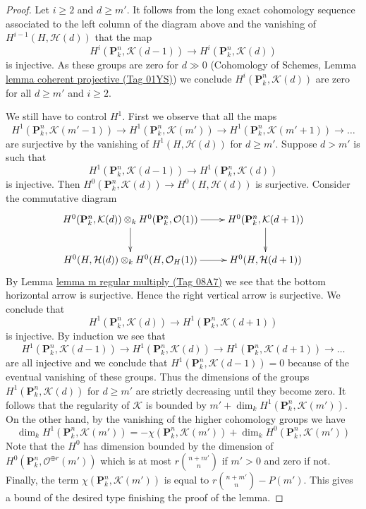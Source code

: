 \documentclass{amsart}
\theoremstyle{plain}
\theoremstyle{definition}
\theoremstyle{remark}
\numberwithin{equation}{subsection}
\begin{document}
\begin{proof}
\medskip\noindent
Let $i \geq 2$ and $d \geq m'$. It follows from the long exact
cohomology sequence associated to the left column of the diagram
above and the vanishing of $H^{i - 1}(H, \mathcal{H}(d))$
that the map
$$
H^i(\mathbf{P}^n_k, \mathcal{K}(d - 1))
\longrightarrow
H^i(\mathbf{P}^n_k, \mathcal{K}(d))
$$
is injective. As these groups are zero for $d \gg 0$
(Cohomology of Schemes,
Lemma \href{https://stacks.math.columbia.edu/tag/01YS}{lemma coherent projective (Tag 01YS)})
we conclude $H^i(\mathbf{P}^n_k, \mathcal{K}(d))$ are zero
for all $d \geq m'$ and $i \geq 2$.

\medskip\noindent
We still have to control $H^1$. First we observe that all the maps
$$
H^1(\mathbf{P}^n_k, \mathcal{K}(m' - 1)) \to
H^1(\mathbf{P}^n_k, \mathcal{K}(m')) \to
H^1(\mathbf{P}^n_k, \mathcal{K}(m' + 1)) \to \ldots
$$
are surjective by the vanishing of $H^1(H, \mathcal{H}(d))$ for $d \geq m'$.
Suppose $d > m'$ is such that
$$
H^1(\mathbf{P}^n_k, \mathcal{K}(d - 1))
\longrightarrow
H^1(\mathbf{P}^n_k, \mathcal{K}(d))
$$
is injective. Then
$H^0(\mathbf{P}^n_k, \mathcal{K}(d)) \to H^0(H, \mathcal{H}(d))$
is surjective. Consider the commutative diagram
$$
\xymatrix{
H^0(\mathbf{P}^n_k, \mathcal{K}(d)) \otimes_k
H^0(\mathbf{P}^n_k, \mathcal{O}(1))
\ar[r] \ar[d] &
H^0(\mathbf{P}^n_k, \mathcal{K}(d + 1)) \ar[d] \\
H^0(H, \mathcal{H}(d)) \otimes_k
H^0(H, \mathcal{O}_H(1))
\ar[r] &
H^0(H, \mathcal{H}(d + 1))
}
$$
By Lemma \href{https://stacks.math.columbia.edu/tag/08A7}{lemma m regular multiply (Tag 08A7)}
we see that the bottom horizontal arrow is surjective.
Hence the right vertical arrow is surjective. We conclude that
$$
H^1(\mathbf{P}^n_k, \mathcal{K}(d))
\longrightarrow
H^1(\mathbf{P}^n_k, \mathcal{K}(d + 1))
$$
is injective. By induction we see that
$$
H^1(\mathbf{P}^n_k, \mathcal{K}(d - 1)) \to
H^1(\mathbf{P}^n_k, \mathcal{K}(d)) \to
H^1(\mathbf{P}^n_k, \mathcal{K}(d + 1)) \to \ldots
$$
are all injective and we conclude that
$H^1(\mathbf{P}^n_k, \mathcal{K}(d - 1)) = 0$
because of the eventual vanishing of these groups. Thus the dimensions
of the groups $H^1(\mathbf{P}^n_k, \mathcal{K}(d))$ for $d \geq m'$
are strictly decreasing until they become zero. It follows that the
regularity of $\mathcal{K}$ is bounded by
$m' + \dim_k H^1(\mathbf{P}^n_k, \mathcal{K}(m'))$.
On the other hand, by the vanishing of the higher cohomology groups
we have
$$
\dim_k H^1(\mathbf{P}^n_k, \mathcal{K}(m')) = 
- \chi(\mathbf{P}^n_k, \mathcal{K}(m')) +
\dim_k H^0(\mathbf{P}^n_k, \mathcal{K}(m'))
$$
Note that the $H^0$ has dimension bounded by the dimension of
$H^0(\mathbf{P}^n_k, \mathcal{O}^{\oplus r}(m'))$ which is
at most $r{n + m' \choose n}$ if $m' > 0$ and zero if not.
Finally, the term $\chi(\mathbf{P}^n_k, \mathcal{K}(m'))$ is equal
to $r{n + m' \choose n} - P(m')$. This gives a bound of the
desired type finishing the proof of the lemma.
\end{proof}
\end{document}
